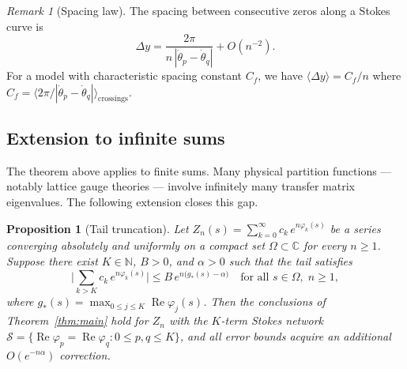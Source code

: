 \documentclass[12pt]{article}
\newtheorem{proposition}[theorem]{Proposition}
\theoremstyle{definition}
\theoremstyle{remark}
\newtheorem{remark}[theorem]{Remark}
\newcommand{\avg}[1]{\langle #1 \rangle}
\newcommand{\re}{\operatorname{Re}}
\begin{document}
\begin{remark}[Spacing law]
The spacing between consecutive zeros along a Stokes curve is
\begin{equation}\label{eq:spacing_law}
\Delta y = \frac{2\pi}{n\,|\dot\theta_p - \dot\theta_q|}
+ O(n^{-2}).
\end{equation}
For a model with characteristic spacing constant $C_f$, we have
$\avg{\Delta y} = C_f/n$ where
$C_f = \bigl\langle 2\pi/|\dot\theta_p - \dot\theta_q|
\bigr\rangle_{\text{crossings}}$.
\end{remark}


\subsection{Extension to infinite sums}

The theorem above applies to finite sums.  Many physical partition
functions --- notably lattice gauge theories --- involve infinitely
many transfer matrix eigenvalues.  The following extension closes
this gap.

\begin{proposition}[Tail truncation]\label{prop:tail}
Let $Z_n(s) = \sum_{k=0}^{\infty} c_k\,e^{n\varphi_k(s)}$ be a
series converging absolutely and uniformly on a compact set
$\Omega \subset \mathbb{C}$ for every $n \geq 1$.  Suppose there
exist $K \in \mathbb{N}$, $B > 0$, and $\alpha > 0$ such that
the tail satisfies
\begin{equation}\label{eq:tail_bound}
\bigg|\sum_{k > K} c_k\,e^{n\varphi_k(s)}\bigg|
\leq B\,e^{n\bigl(g_*(s) - \alpha\bigr)}
\quad\text{for all } s \in \Omega,\; n \geq 1,
\end{equation}
where $g_*(s) = \max_{0 \leq j \leq K} \re\varphi_j(s)$.
Then the conclusions of Theorem~\textup{\ref{thm:main}} hold
for $Z_n$ with the $K$-term Stokes network
$\mathcal{S} = \bigl\{\re\varphi_p = \re\varphi_q :
0 \leq p, q \leq K\bigr\}$,
and all error bounds acquire an additional $O(e^{-n\alpha})$
correction.
\end{proposition}
\end{document}
